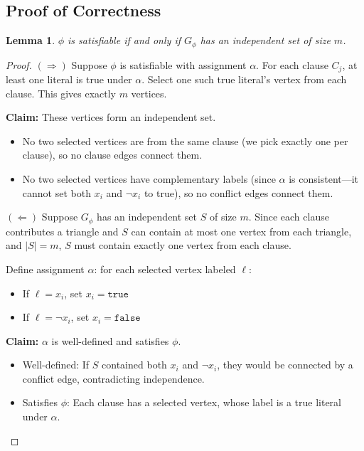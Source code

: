 \documentclass[11pt,a4paper]{article}
\newtheorem{lemma}[theorem]{Lemma}
\begin{document}
\subsection{Proof of Correctness}

\begin{lemma}
$\phi$ is satisfiable if and only if $G_\phi$ has an independent set of size $m$.
\end{lemma}

\begin{proof}
$(\Rightarrow)$ Suppose $\phi$ is satisfiable with assignment $\alpha$. For each clause $C_j$, at least one literal is true under $\alpha$. Select one such true literal's vertex from each clause. This gives exactly $m$ vertices.

\textbf{Claim:} These vertices form an independent set.
\begin{itemize}
    \item No two selected vertices are from the same clause (we pick exactly one per clause), so no clause edges connect them.
    \item No two selected vertices have complementary labels (since $\alpha$ is consistent---it cannot set both $x_i$ and $\neg x_i$ to true), so no conflict edges connect them.
\end{itemize}

$(\Leftarrow)$ Suppose $G_\phi$ has an independent set $S$ of size $m$. Since each clause contributes a triangle and $S$ can contain at most one vertex from each triangle, and $|S| = m$, $S$ must contain exactly one vertex from each clause.

Define assignment $\alpha$: for each selected vertex labeled $\ell$:
\begin{itemize}
    \item If $\ell = x_i$, set $x_i = \texttt{true}$
    \item If $\ell = \neg x_i$, set $x_i = \texttt{false}$
\end{itemize}

\textbf{Claim:} $\alpha$ is well-defined and satisfies $\phi$.
\begin{itemize}
    \item Well-defined: If $S$ contained both $x_i$ and $\neg x_i$, they would be connected by a conflict edge, contradicting independence.
    \item Satisfies $\phi$: Each clause has a selected vertex, whose label is a true literal under $\alpha$.
\end{itemize}
\end{proof}
\end{document}

